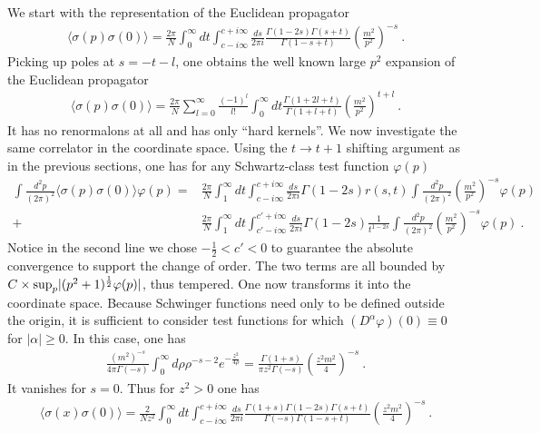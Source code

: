 \documentclass[a4paper,11pt]{article}
\begin{document}
We start with the representation of the Euclidean propagator
\begin{align}
\langle \sigma(p)\sigma(0)\rangle=\frac{2\pi}{N}\int_{0}^{\infty} dt \int_{c-i\infty}^{c+i\infty} \frac{ds}{2\pi i}\frac{\Gamma(1-2s)\Gamma(s+t)}{\Gamma(1-s+t)}\left(\frac{m^2}{p^2}\right)^{-s} \ .
\end{align}
Picking up poles at $s=-t-l$, one obtains the well known large $p^2$ expansion of the Euclidean propagator
\begin{align}\label{eq:expandmom}
\langle \sigma(p)\sigma(0) \rangle =\frac{2\pi}{N}\sum_{l=0}^{\infty}\frac{(-1)^l}{l!}\int_{0}^{\infty}dt\frac{\Gamma(1+2l+t)}{\Gamma(1+l+t)}\left(\frac{m^2}{p^2}\right)^{t+l} \ .
\end{align}
It has no renormalons at all and has only ``hard kernels''. We now investigate the same correlator in the coordinate space. Using the $t\rightarrow t+1$ shifting argument as in the previous sections, one has for any Schwartz-class test function $\varphi(p)$
\begin{align}
\int \frac{d^2p}{(2\pi)^2}\langle \sigma(p)\sigma(0)\rangle\varphi(p)=&\frac{2\pi}{N}\int_{1}^{\infty} dt \int_{c-i\infty}^{c+i\infty} \frac{ds}{2\pi i}\Gamma(1-2s)r(s,t)\int \frac{d^2p}{(2\pi)^2}\left(\frac{m^2}{p^2}\right)^{-s}\varphi(p) \nonumber \\
+&\frac{2\pi}{N}\int_{1}^{\infty} dt \int_{c'-i\infty}^{c'+i\infty} \frac{ds}{2\pi i}\Gamma(1-2s)\frac{1}{t^{1-2s}}\int \frac{d^2p}{(2\pi)^2}\left(\frac{m^2}{p^2}\right)^{-s}\varphi(p)  \ .
\end{align}
Notice in the second line we chose $-\frac{1}{2}<c'<0$ to guarantee the absolute convergence to support the change of order. The two terms are all bounded by $C\times{\rm sup}_{p}|(p^2+1)^{\frac{1}{2}}\varphi(p)|$, thus tempered. One now transforms it into the coordinate space. Because Schwinger functions need only to be defined outside the origin, it is sufficient to consider test functions for which $(D^\alpha\varphi)(0)\equiv 0$ for $|\alpha|\ge 0$. In this case, one has 
\begin{align}
\frac{(m^2)^{-s}}{4\pi \Gamma(-s)}\int_{0}^{\infty}d\rho\rho^{-s-2}e^{-\frac{z^2}{4\rho}}=\frac{\Gamma(1+s)}{\pi z^2\Gamma(-s)}\left(\frac{z^2m^2}{4}\right)^{-s} \ .
\end{align}
It vanishes for $s=0$. Thus for $z^2>0$ one has 
\begin{align}
\langle\sigma(x)\sigma(0)\rangle=\frac{2}{Nz^2}\int_{0}^{\infty} dt \int_{c-i\infty}^{c+i\infty} \frac{ds}{2\pi i}\frac{\Gamma(1+s)\Gamma(1-2s)\Gamma(s+t)}{\Gamma(-s)\Gamma(1-s+t)}\left(\frac{z^2m^2}{4}\right)^{-s} \ .
\end{align}
\end{document}
